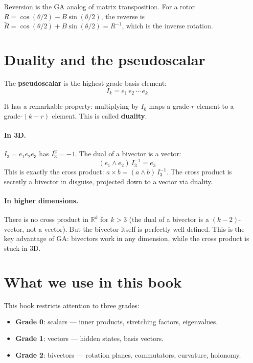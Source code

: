\documentclass[11pt, twoside, openright]{memoir}
\newcommand{\op}{\wedge}          %
\newcommand{\rev}[1]{\widetilde{#1}} %
\numberwithin{equation}{chapter}
\begin{document}
Reversion is the GA analog of matrix transposition.  For a rotor
$R = \cos(\theta/2) - B\sin(\theta/2)$, the reverse is
$\rev{R} = \cos(\theta/2) + B\sin(\theta/2) = R^{-1}$, which is the
inverse rotation.

\section{Duality and the pseudoscalar}

The \textbf{pseudoscalar} is the highest-grade basis element:
\begin{equation}
  I_k = e_1 \, e_2 \, \cdots \, e_k
\end{equation}

It has a remarkable property: multiplying by $I_k$ maps a grade-$r$
element to a grade-$(k-r)$ element.  This is called \textbf{duality}.

\paragraph{In 3D.}
$I_3 = e_1 e_2 e_3$ has $I_3^2 = -1$.  The dual of a bivector is a
vector:
\begin{equation}
  (e_1 \op e_2)\, I_3^{-1} = e_3
\end{equation}
This is exactly the cross product: $a \times b = (a \op b)\, I_3^{-1}$.
The cross product is secretly a bivector in disguise, projected down
to a vector via duality.

\paragraph{In higher dimensions.}
There is no cross product in $\mathbb{R}^k$ for $k > 3$ (the dual of a
bivector is a $(k-2)$-vector, not a vector).  But the bivector itself
is perfectly well-defined.  This is the key advantage of GA: bivectors
work in any dimension, while the cross product is stuck in 3D.

\section{What we use in this book}

This book restricts attention to three grades:
\begin{itemize}[nosep]
\item \textbf{Grade 0}: scalars --- inner products, stretching factors,
  eigenvalues.
\item \textbf{Grade 1}: vectors --- hidden states, basis vectors.
\item \textbf{Grade 2}: bivectors --- rotation planes, commutators,
  curvature, holonomy.
\end{itemize}
\end{document}

